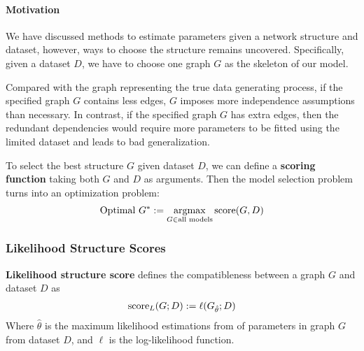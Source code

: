 \documentclass[11pt]{article}
\begin{document}
	\paragraph{Motivation} We have discussed methods to estimate parameters given a network structure and dataset, however, ways to choose the structure remains uncovered.
	Specifically, given a dataset $D$, we have to choose one graph $G$ as the skeleton of our model.

	 Compared with the graph representing the true data generating process, if the specified graph $G$ contains less edges, $G$ imposes more independence assumptions than necessary.
	 In contrast, if the specified graph $G$ has extra edges, then the redundant dependencies would require more parameters to be fitted using the limited dataset and leads to bad generalization.
	
	To select the best structure $G$ given dataset $D$, we can define a \textbf{scoring function} taking both $G$ and $D$ as arguments.
	Then the model selection problem turns into an optimization problem:
	\begin{align}
		\text{{Optimal }} G^* := \operatorname*{argmax}_{G \in \text{{all models}}} \text{{score}}(G, D)
	\end{align}

	\subsubsection{Likelihood Structure Scores}
	\begin{definition}
		\textbf{Likelihood structure score} defines the compatibleness between a graph $G$ and dataset $D$ as
		\begin{align}
			\text{{score}}_L (G; D) := \ell(G_{\hat{\theta}}; D)
		\end{align}
		Where $\hat{\theta}$ is the maximum likelihood estimations from of parameters in graph $G$ from dataset $D$, and $\ell$ is the log-likelihood function.
	\end{definition}
\end{document}
